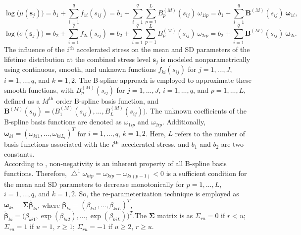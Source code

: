 \documentclass[twoside]{article}
\begin{document}
\begin{equation}\label{eq2.3}
\log \big(\mu(\boldsymbol{s}_{j})\big) = b_{1} + \sum_{i=1}^{q}f_{1i}(s_{ij}) =  b_{1} + \sum_{i=1}^{q} \sum_{p=1}^{L} B^{(M)}_{p}(s_{ij})\: \omega_{1ip} = b_{1} + \sum_{i=1}^{q} \boldsymbol{B}^{(M)}(s_{ij})\: \boldsymbol{\omega}_{1i},
\end{equation}
\begin{equation}\label{eq2.4}
\log\big(\sigma(\boldsymbol{s}_{j})\big) = b_{2} + \sum_{i=1}^{q}f_{2i}(s_{ij}) = b_{2} + \sum_{i=1}^{q} \sum_{p=1}^{L} B^{(M)}_{p}(s_{ij})\: \omega_{2ip} = b_{2} + \sum_{i=1}^{q} \boldsymbol{B}^{(M)}(s_{ij})\: \boldsymbol{\omega}_{2i}.
\end{equation}
 The influence of the $i^{\text{th}}$ accelerated stress on the mean and SD parameters of the lifetime distribution at the combined stress level $\boldsymbol{s}_{j}$ is modeled nonparametrically using continuous, smooth, and unknown functions $f_{ki}(s_{ij})$ for $j=1,\ldots,J$, $i=1,\ldots,q$, and $k=1,2$. The B-spline approach is employed to approximate these smooth functions, with $B^{(M)}_{p}(s_{ij})$ for $j=1,\ldots,J$, $i=1,\ldots,q$, and $p=1,\ldots,L$, defined as a $M^{\text{th}}$ order B-spline basis function, and $\boldsymbol{B}^{(M)}(s_{ij})=\big(B^{(M)}_{1}(s_{ij}),\ldots, B^{(M)}_{L}(s_{ij})\big)$. The unknown coefficients of the B-spline basis functions are denoted as $\omega_{1ip}$ and $\omega_{2ip}$. Additionally, $\boldsymbol{\omega}_{ki}=(\omega_{ki1},\ldots,\omega_{kiL_{i}})^{T}$ for $i=1,\ldots,q$, $k=1,2$. Here, $L$ refers to the number of basis functions associated with the $i^{\text{th}}$ accelerated stress, and $b_{1}$ and $b_{2}$ are two constants.\\ 
According to \cite{De Boor:1978}, non-negativity is an inherent property of all B-spline basis functions. Therefore, $\bigtriangleup^{1}\omega_{kip}=\omega_{kip}-\omega_{ki(p-1)} <0$ is a sufficient condition for the mean and SD parameters to decrease monotonically for $p=1,\ldots, L$, $i=1,\ldots,q$, and $k = 1, 2$. So, the re-parameterization technique is employed as $\boldsymbol{\omega}_{ki}=\boldsymbol{\Sigma}\tilde{\boldsymbol{\beta}}_{ki}$, where $\boldsymbol{\beta}_{ki}=(\beta_{ki1},\ldots,\beta_{kiL})^{T}$, $\tilde{\boldsymbol{\beta}}_{ki}=\big(\beta_{ki1},\exp(\beta_{ki2}),\ldots,\exp(\beta_{kiL})\big)^{T}$.The $\boldsymbol{\Sigma}$ matrix is as $\Sigma_{ru}=0$ if $r<u$; $\Sigma_{ru}=1$ if $u=1$, $r\geq 1$; $\Sigma_{ru}=-1$ if $u\geq 2$, $r\geq u$.\\
\end{document}
